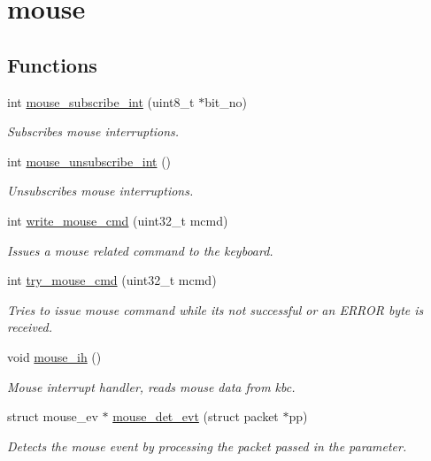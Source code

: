 \hypertarget{group__mouse}{}\section{mouse}
\label{group__mouse}
\subsection*{Functions}
\begin{DoxyCompactItemize}
\item 
int \mbox{\hyperlink{group__mouse_ga9da18257ff113b686bb826d154bfaa87}{mouse\+\_\+subscribe\+\_\+int}} (uint8\+\_\+t $\ast$bit\+\_\+no)
\begin{DoxyCompactList}\small\item\em Subscribes mouse interruptions. \end{DoxyCompactList}\item 
int \mbox{\hyperlink{group__mouse_ga685ad2706aca36d9869a30a19b9f446a}{mouse\+\_\+unsubscribe\+\_\+int}} ()
\begin{DoxyCompactList}\small\item\em Unsubscribes mouse interruptions. \end{DoxyCompactList}\item 
int \mbox{\hyperlink{group__mouse_ga992ee1b8a073ba102ee34e483b25c380}{write\+\_\+mouse\+\_\+cmd}} (uint32\+\_\+t mcmd)
\begin{DoxyCompactList}\small\item\em Issues a mouse related command to the keyboard. \end{DoxyCompactList}\item 
int \mbox{\hyperlink{group__mouse_ga34f5d4446d7bc96bd4456ceab5d08ec9}{try\+\_\+mouse\+\_\+cmd}} (uint32\+\_\+t mcmd)
\begin{DoxyCompactList}\small\item\em Tries to issue mouse command while its not successful or an E\+R\+R\+OR byte is received. \end{DoxyCompactList}\item 
void \mbox{\hyperlink{group__mouse_ga834b6d7efe311484d6da234db333cb97}{mouse\+\_\+ih}} ()
\begin{DoxyCompactList}\small\item\em Mouse interrupt handler, reads mouse data from kbc. \end{DoxyCompactList}\item 
struct mouse\+\_\+ev $\ast$ \mbox{\hyperlink{group__mouse_ga992f9c38f09f0aa71b62cba658094dbe}{mouse\+\_\+det\+\_\+evt}} (struct packet $\ast$pp)
\begin{DoxyCompactList}\small\item\em Detects the mouse event by processing the packet passed in the parameter. \end{DoxyCompactList}\end{DoxyCompactItemize}


